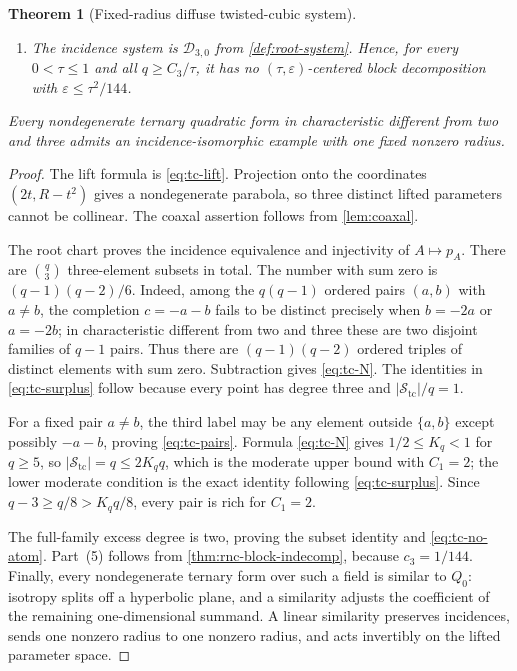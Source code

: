 \documentclass[11pt,letterpaper]{amsart}
\newtheorem{theorem}{Theorem}[section]
\theoremstyle{definition}
\theoremstyle{remark}
\newcommand{\1}{\mathbf 1}
\begin{document}
\begin{theorem}[Fixed-radius diffuse twisted-cubic system]
\begin{enumerate}[label=\textup{(\arabic*)}]
\begin{equation}\label{eq:tc-no-atom}
 \frac{\sigma(P_{\mathrm{tc}}\cap S_a\cap S_b,\mathcal S_{\mathrm{tc}})}{\Sigma}
 \le\frac6{(q-1)^2}.
\end{equation}
\item The incidence system is $\mathcal D_{3,0}$ from \cref{def:root-system}.  Hence, for every $0<\tau\le1$ and all $q\ge C_3/\tau$, it has no $(\tau,\varepsilon)$-centered block decomposition with $\varepsilon\le\tau^2/144$.
\end{enumerate}
Every nondegenerate ternary quadratic form in characteristic different from two and three admits an incidence-isomorphic example with one fixed nonzero radius.
\end{theorem}

\begin{proof}
The lift formula is \eqref{eq:tc-lift}.  Projection onto the coordinates $(2t,R-t^2)$ gives a nondegenerate parabola, so three distinct lifted parameters cannot be collinear.  The coaxal assertion follows from \cref{lem:coaxal}.

The root chart proves the incidence equivalence and injectivity of $A\mapsto p_A$.  There are $\binom q3$ three-element subsets in total.  The number with sum zero is $(q-1)(q-2)/6$.  Indeed, among the $q(q-1)$ ordered pairs $(a,b)$ with $a\ne b$, the completion $c=-a-b$ fails to be distinct precisely when $b=-2a$ or $a=-2b$; in characteristic different from two and three these are two disjoint families of $q-1$ pairs.  Thus there are $(q-1)(q-2)$ ordered triples of distinct elements with sum zero.  Subtraction gives \eqref{eq:tc-N}.  The identities in \eqref{eq:tc-surplus} follow because every point has degree three and $|\mathcal S_{\mathrm{tc}}|/q=1$.

For a fixed pair $a\ne b$, the third label may be any element outside $\{a,b\}$ except possibly $-a-b$, proving \eqref{eq:tc-pairs}.  Formula \eqref{eq:tc-N} gives $1/2\le K_q<1$ for $q\ge5$, so $|\mathcal S_{\mathrm{tc}}|=q\le2K_qq$, which is the moderate upper bound with $C_1=2$; the lower moderate condition is the exact identity following \eqref{eq:tc-surplus}.  Since $q-3\ge q/8>K_qq/8$, every pair is rich for $C_1=2$.

The full-family excess degree is two, proving the subset identity and \eqref{eq:tc-no-atom}.  Part~(5) follows from \cref{thm:rnc-block-indecomp}, because $c_3=1/144$.  Finally, every nondegenerate ternary form over such a field is similar to $Q_0$: isotropy splits off a hyperbolic plane, and a similarity adjusts the coefficient of the remaining one-dimensional summand.  A linear similarity preserves incidences, sends one nonzero radius to one nonzero radius, and acts invertibly on the lifted parameter space.
\end{proof}
\end{document}
